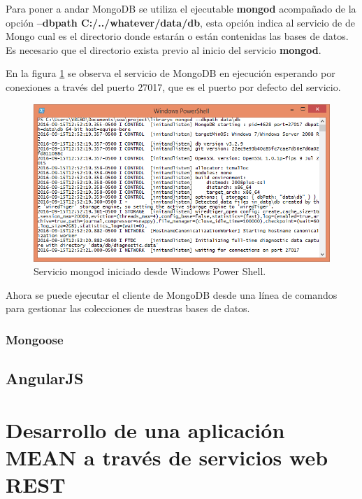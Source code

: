 \documentclass[10pt,a4paper]{report}
\begin{document}
Para poner a andar MongoDB se utiliza el ejecutable \textbf{mongod} acompañado de la opción \textbf{--dbpath  C:/../whatever/data/db}, esta opción indica al servicio de de Mongo cual es el directorio donde estarán o están contenidas las bases de datos. Es necesario que el directorio exista previo al inicio del servicio \textbf{mongod}.

En la figura \ref{fig:mongod-service} se observa el servicio de MongoDB en ejecución esperando por conexiones a través del puerto 27017, que es el puerto por defecto del servicio.\\

\begin{figure}[H]
	\centering
	\includegraphics[scale=0.65]{images/mongo-service-started}
	\caption{Servicio mongod iniciado desde Windows Power Shell.}\label{fig:mongod-service}
\end{figure}

Ahora se puede ejecutar el cliente de MongoDB desde una línea de comandos para gestionar las colecciones de nuestras bases de datos.





\subsection{Mongoose}

\section{AngularJS}

\chapter{Desarrollo de una aplicación MEAN a través de servicios web REST}
\end{document}
